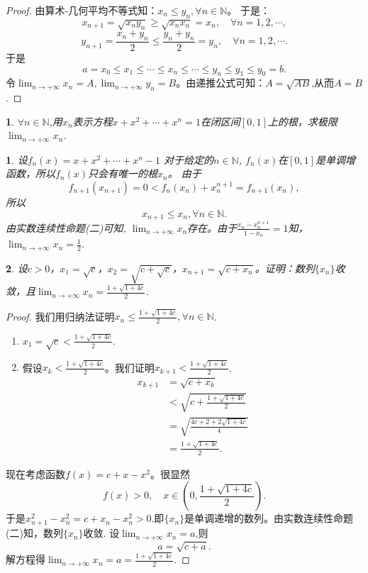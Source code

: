 \documentclass[utf8]{book}
\newtheorem{example}{}[section]             %
\newtheorem{solution}{}
\begin{document}
\begin{proof}
由算术-几何平均不等式知：$x_n \leq y_n, \forall n\in\mathbb{N}$。
于是：
$$x_{n+1} = \sqrt{x_{n}y_{n}} \geq \sqrt{x_{n}x_{n}} = x_n,\quad\forall n = 1,2,\cdots,$$
$$y_{n+1} = \frac{x_{n}+y_{n}}{2} \leq \frac{y_{n}+y_{n}}{2} = y_n, \quad\forall n = 1,2,\cdots.$$
于是$$a = x_0 \leq x_1 \leq \cdots \leq x_n \leq\cdots \leq y_n \leq y_1 \leq y_0 = b.$$
令$\displaystyle \lim_{n\to +\infty}x_n=A, \displaystyle \lim_{n\to +\infty}y_n=B$。由递推公式可知：$A=\sqrt{AB}$,从而$A = B$.
\end{proof}
\begin{example}
$\forall n\in\mathbb{N}$,用$x_n$表示方程$x+x^2+\cdots+x^n=1$在闭区间$[0,1]$上的根，求极限$\displaystyle \lim_{n\to +\infty}x_n$.
\end{example}
\begin{solution}
设$f_n(x) = x+x^2+\cdots+x^n -1$
对于给定的$n\in \mathbb{N}$, $f_n(x)$在$[0,1]$是单调增函数，所以$f_n(x)$只会有唯一的根$x_n$。
由于$$f_{n+1}(x_{n+1}) = 0 < f_{n}(x_n) + x_n^{n+1} = f_{n+1}(x_n),$$
所以$$x_{n+1} \leq x_n,\forall n\in\mathbb{N}.$$
由实数连续性命题(二)可知, $\displaystyle \lim_{n\to +\infty}x_n$存在。由于$\displaystyle\frac{x_n-x_n^{n+1}}{1-x_n} = 1$知，
$\displaystyle \lim_{n\to +\infty}x_n=\frac{1}{2}$.
\end{solution}
\begin{example}
设$c> 0$，$x_1=\sqrt{c}$，$\displaystyle x_2=\sqrt{c+\sqrt{c}}$，$x_{n+1}=\sqrt{c+x_n}$。证明：数列$\{x_n\}$收敛，且$\displaystyle \lim_{n\to +\infty}x_n=\frac{1+\sqrt{1+4c}}{2}$.
\end{example}
\begin{proof}
我们用归纳法证明$x_n \leq \displaystyle\frac{1+\sqrt{1+4c}}{2}, \forall n\in\mathbb{N}$.
\renewcommand\labelenumi{\normalfont(\theenumi)}
\begin{enumerate}
\item $x_1 = \sqrt{c} < \displaystyle\frac{1+\sqrt{1+4c}}{2}$.
\item 假设$x_k < \displaystyle\frac{1+\sqrt{1+4c}}{2}$。我们证明$x_{k+1} < \displaystyle\frac{1+\sqrt{1+4c}}{2}$.
\begin{equation*}
\begin{split}
x_{k+1} &=\sqrt{c+x_{k}} \\&< \sqrt{c+\frac{1+\sqrt{1+4c}}{2}}\\&=\sqrt{\frac{4c+2+2\sqrt{1+4c}}{4}}\\
&=\frac{1+\sqrt{1+4c}}{2}.
\end{split}
\end{equation*}
\end{enumerate}

现在考虑函数$f(x) =c+x-x^2$。很显然$$f(x) > 0, \quad x\in \left(0, \displaystyle\frac{1+\sqrt{1+4c}}{2}\right).$$
于是$x_{n+1}^2 -x_{n}^2 = c+ x_{n}-x_n^{2} > 0$.即$\{x_n\}$是单调递增的数列。由实数连续性命题(二)知，数列$\{x_n\}$收敛. 设$\displaystyle \lim_{n\to +\infty}x_n=a$,则
$$a=\sqrt{c+a}.$$解方程得$\displaystyle \lim_{n\to +\infty}x_n=a =\frac{1+\sqrt{1+4c}}{2}.$
\end{proof}
\end{document}
